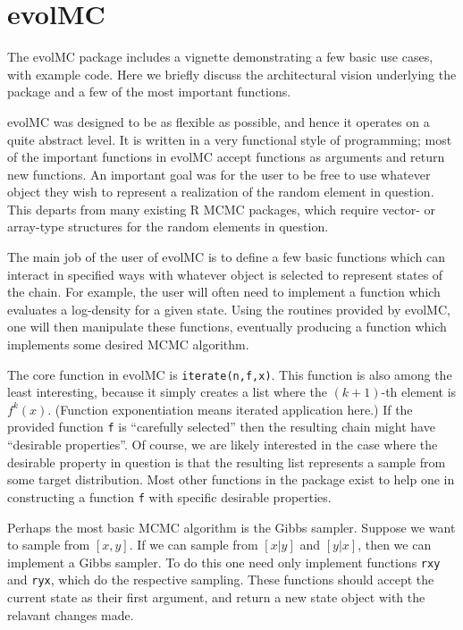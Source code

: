 \documentclass[12pt]{article}\usepackage[]{graphicx}\usepackage[]{color}
\begin{document}
 

\appendix

\section{evolMC}
\label{sec:evolmc}
The evolMC package includes a vignette demonstrating a few basic use cases, with example code. Here we briefly discuss the architectural vision underlying the package and a few of the most important functions.

evolMC was designed to be as flexible as possible, and hence it operates on a quite abstract level. It is written in a very functional style of programming; most of the important functions in evolMC accept functions as arguments and return new functions. An important goal was for the user to be free to use whatever object they wish to represent a realization of the random element in question. This departs from many existing R MCMC packages, which require vector- or array-type structures for the random elements in question.

The main job of the user of evolMC is to define a few basic functions which can interact in specified ways with whatever object is selected to represent states of the chain. For example, the user will often need to implement a function which evaluates a log-density for a given state. Using the routines provided by evolMC, one will then manipulate these functions, eventually producing a function which implements some desired MCMC algorithm.

The core function in evolMC is \texttt{iterate(n,f,x)}. This function is also among the least interesting, because it simply creates a list where the $(k+1)$-th element is $f^{k}(x)$. (Function exponentiation means iterated application here.) If the provided function {\tt f} is ``carefully selected'' then the resulting chain might have ``desirable properties''. Of course, we are likely interested in the case where the desirable property in question is that the resulting list represents a sample from some target distribution. Most other functions in the package exist to help one in constructing a function {\tt f} with specific desirable properties.

Perhaps the most basic MCMC algorithm is the Gibbs sampler. Suppose we want to sample from $[x,y]$. If we can sample from $[x|y]$ and $[y|x]$, then we can implement a Gibbs sampler. To do this one need only implement functions {\tt rxy} and {\tt ryx}, which do the respective sampling. These functions should accept the current state as their first argument, and return a new state object with the relavant changes made.
\end{document}
